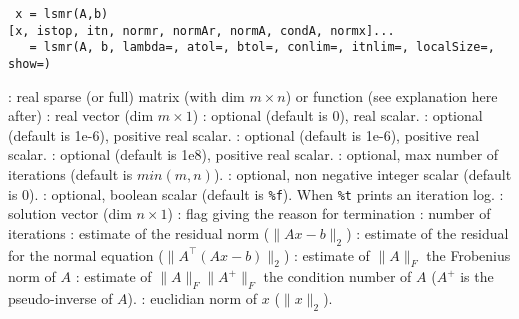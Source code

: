 
\begin{mandesc}
\end{mandesc}
\begin{calling_sequence}
\begin{verbatim}
 x = lsmr(A,b)
[x, istop, itn, normr, normAr, normA, condA, normx]...
   = lsmr(A, b, lambda=, atol=, btol=, conlim=, itnlim=, localSize=, show=)
\end{verbatim}
\end{calling_sequence}
\begin{parameters}
  \begin{varlist}
    : real sparse (or full) matrix (with dim $m \times n$) or
               function (see explanation here after)
    : real vector (dim $m \times 1$) 
    : optional (default is 0), real scalar.
    : optional (default is 1e-6), positive real scalar.
    : optional (default is 1e-6), positive real scalar.
    : optional (default is 1e8), positive real scalar.
    : optional, max number of iterations (default is $min(m,n)$).
    : optional, non negative integer scalar (default is 0).
    : optional, boolean scalar (default is \verb+%f+). When \verb+%t+
                   prints an iteration log.
    : solution vector (dim $n \times 1$)
    : flag giving the reason for termination
    : number of iterations
    : estimate of the residual norm ($\|Ax-b\|_2$)
    : estimate of the residual for the normal equation ($\|A^{\top}(Ax-b)\|_2$)
    : estimate of $\| A \|_F$ the Frobenius norm of $A$
    : estimate of  $\| A \|_F \| A^+ \|_F$ the condition number of $A$ ($A^+$
                   is the pseudo-inverse of $A$).
    : euclidian norm of $x$ ($\|x\|_2$).
  \end{varlist}
\end{parameters}

